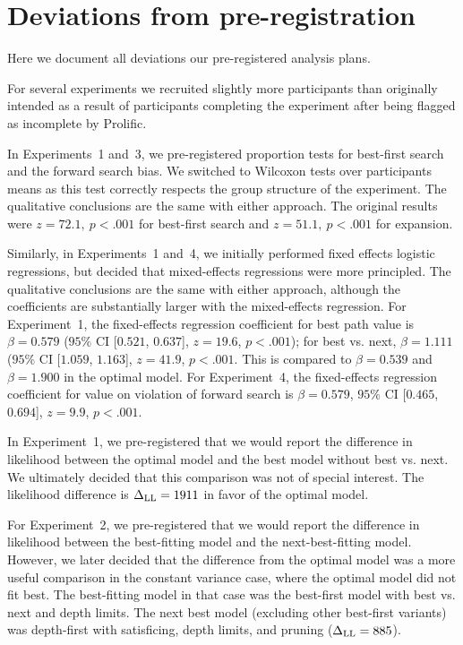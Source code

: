 
\label{app:planning}

\section{Deviations from pre-registration}\label{app:planning-deviations}
Here we document all deviations our pre-registered analysis plans.

For several experiments we recruited slightly more participants than originally intended as a result of participants completing the experiment after being flagged as incomplete by Prolific.

In Experiments~1 and~3, we pre-registered proportion tests for best-first search and the forward search bias. We switched to Wilcoxon tests over participants means as this test correctly respects the group structure of the experiment. The qualitative conclusions are the same with either approach. The original results were $z=72.1,\ p < .001$ for best-first search and $z=51.1,\ p < .001$ for expansion.

Similarly, in Experiments~1 and~4, we initially performed fixed effects logistic regressions, but decided that mixed-effects regressions were more principled. The qualitative conclusions are the same with either approach, although the coefficients are substantially larger with the mixed-effects regression. For Experiment~1, the fixed-effects regression coefficient for best path value is $\beta = 0.579$ ($95\%$ CI [$0.521$, $0.637$], $z = 19.6$, $p < .001$); for best vs. next, $\beta = 1.111$ ($95\%$ CI [$1.059$, $1.163$], $z = 41.9$, $p < .001$. This is compared to $\beta = 0.539$ and $\beta = 1.900$ in the optimal model. For Experiment~4, the fixed-effects regression coefficient for value on violation of forward search is $\beta = 0.579$, $95\%$ CI [$0.465$, $0.694$], $z = 9.9$, $p < .001$.

In Experiment~1, we pre-registered that we would report the difference in likelihood between the optimal model and the best model without best vs. next. We ultimately decided that this comparison was not of special interest. The likelihood difference is $\Delta_{\mathrm{LL}} = 1911$ in favor of the optimal model.

For Experiment~2, we pre-registered that we would report the difference in likelihood between the best-fitting model and the next-best-fitting model. However, we later decided that the difference from the optimal model was a more useful comparison in the constant variance case, where the optimal model did not fit best. The best-fitting model in that case was the best-first model with best vs. next and depth limits. The next best model (excluding other best-first variants) was depth-first with satisficing, depth limits, and pruning ($\Delta_{\mathrm{LL}} = 885$).

